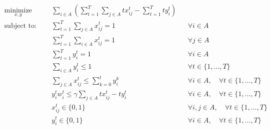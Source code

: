 $$\begin{aligned}
  \underset{x, y}{\text{minimize}}\qquad& \sum_{i\in A}\left(\sum_{t = 1}^{T} \sum_{j\in A} tx_{ij}^{t} - \sum_{t = 1}^{T} ty_{i}^{t} \right)\\
    \text{subject to:}\qquad& \sum_{t = 1}^{T} \sum_{j\in A} x_{ij}^{t} = 1 && \forall i \in A\\
    & \sum_{t = 1}^{T} \sum_{i \in A} x_{ij}^{t} = 1 && \forall j \in A \\
    & \sum_{t = 1}^{T} y_{i}^{t} = 1 && \forall i \in A \\
    & \sum_{i \in A} y_{i}^{t} \le 1 && \forall t \in \{ 1, \dots , T \}\\
    & \sum_{j\in A} x_{ij}^{t} \le \sum_{k = 0}^{t} y_{i}^{k} && \forall i \in A, \quad \forall t \in \{ 1, \dots , T \}\\
    & y_{i}^{t} w_{i}^{t} \le \gamma \sum_{j\in A} tx_{ij}^{t} - ty_{i}^{t} && \forall i \in A, \quad \forall t \in \{ 1, \dots , T \} \\
    & x_{ij}^{t} \in \{0, 1\} && \forall i,j \in A, \quad \forall t \in \{ 1, \dots , T \} \\
    & y_{i}^{t} \in \{0, 1\} && \forall i \in A, \quad \forall t \in \{ 1, \dots , T \}
\end{aligned}$$

